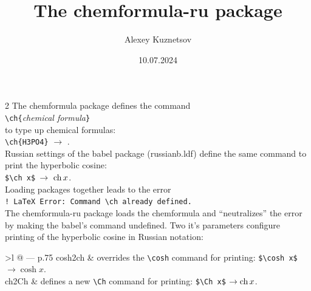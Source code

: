 \documentclass[a4paper]{article}
\begin{document}
\title{The \textsf{chemformula-ru} package}
\author{Alexey Kuznetsov}
\date{10.07.2024}
\maketitle

\begin{multicols}{2}
The \textsf{chemformula} package defines the command\\[.5ex]
\mbox{}\hfil\verb|\сh{|\textit{chemical formula}\verb|}|\\[.5ex]
to type up chemical formulas:\\[.5ex]
\mbox{}\hfil\verb|\ch{H3PO4}| $\to$ .\\[.5ex]
Russian settings of the \textsf{babel} package \textsf{(russianb.ldf)} define the same command to print the hyperbolic cosine:\\[.5ex] 
\mbox{}\hfil\verb|$\ch x$|\ $\to\ \Ch x$.\\[.5ex]
Loading packages together leads to the error\\[1ex]
\mbox{}\hfil\verb|! LaTeX Error: Command \ch already defined.|\\[1ex]
The \textsf{chemformula-ru} package loads the \textsf{chemformula} and ``neutralizes'' the error by making the babel's command undefined.
Two it's parameters configure printing of the hyperbolic cosine in Russian notation:\\[1ex]
\begin{tabular}{>\sf l @{ ---\quad } p{.75\linewidth}}
cosh2ch & overrides the \verb|\cosh| command for printing:\linebreak
          \verb|$\cosh x$| $\to \cosh x$.  \\[1ex]
ch2Ch & defines a new \verb|\Ch| command for printing:\linebreak
         \verb|$\Ch x$| $\to \Ch x$.
\end{tabular}\\[1ex]


\end{multicols}
\end{document}
